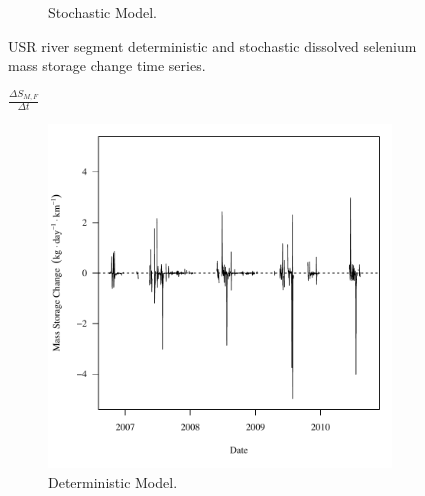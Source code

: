 \begin{linenumbers}
\begin{landscape}
\begin{figure}
\begin{subfigure}{0.7\textwidth}
			\caption{Stochastic Model.}
		\end{subfigure}
		\caption{USR river segment deterministic and stochastic dissolved selenium mass storage change time series.}
	\end{figure}
\end{landscape}



\subfiguretop
\begin{landscape}
	\begin{figure}
		$ \displaystyle \frac{\Delta S_{M,F}}{\Delta t} $
		\begin{subfigure}{0.7\textwidth}
			\centering
			\includegraphics[width=\tableCustomSize]{"Figures/Results_DSR/Deterministic/f Segment F"}
			\caption{Deterministic Model.}
		\end{subfigure}%
		\begin{subfigure}{0.7\textwidth}
			\centering

\end{subfigure}
\end{figure}
\end{landscape}
\end{linenumbers}
